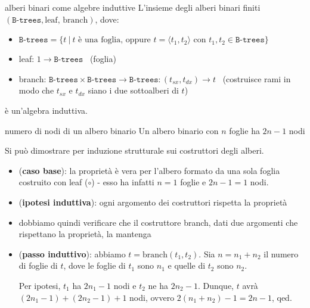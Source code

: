 \documentclass[a4paper,11pt]{report}
\begin{document}
\begin{gbox}{alberi binari come algebre induttive}
    L'insieme degli alberi binari finiti \( (\texttt{B-trees}, \text{leaf, branch}) \), dove:
    \begin{itemize}
        \item \( \texttt{B-trees}=\{t \ | \ t \text{ è una foglia, oppure } t=\langle t_1, t_2 \rangle \text{ con } t_1, t_2 \in \texttt{B-trees}\} \)
        \item leaf: \( 1\to \texttt{B-trees} \) \ {\color{gray}(foglia)}
        \item branch: \( \texttt{B-trees} \times  \texttt{B-trees} \to  \texttt{B-trees} : (t_{sx}, t_{dx})\to t\) \ {\color{gray}(costruisce rami in modo che \( t_{sx} \) e \( t_{dx} \) siano i due sottoalberi di \( t \))}
    \end{itemize}
    è un'algebra induttiva.
    \begin{thmbox}{numero di nodi di un albero binario}{}
        Un albero binario con \( n \) foglie ha \( 2n-1 \) nodi
        \begin{proofbox}
            Si può dimostrare per induzione strutturale sui costruttori degli alberi.
            \begin{itemize}
                \item (\textbf{caso base}): la proprietà è vera per l'albero formato da una sola foglia costruito con leaf (\( \circ \)) - esso ha infatti \( n = 1 \) foglie e \( 2n-1 = 1 \) nodi.
                \item (\textbf{ipotesi induttiva}): ogni argomento dei costruttori rispetta la proprietà
                \item dobbiamo quindi verificare che il costruttore branch, dati due argomenti che rispettano la proprietà, la mantenga
                \item (\textbf{passo induttivo}): abbiamo \( t = \text{branch}(t_1, t_2)\). 
                    \subitem Sia \(n = n_1 + n_2 \) il numero di foglie di \( t \), dove le foglie di \( t_1 \) sono \( n_1 \) e quelle di \( t_2 \) sono \( n_2 \). 

                    Per ipotesi, \( t_1 \) ha \( 2n_1 - 1 \) nodi e \( t_2 \) ne ha \( 2n_2 - 1 \). Dunque, \( t \) avrà \( (2n_1 -1) + (2n_2 -1) + 1\) nodi, ovvero \( 2(n_1 + n_2) -1 = 2n - 1 \), qed.
            \end{itemize}

        \end{proofbox}

    \end{thmbox}
\end{gbox}
\end{document}
